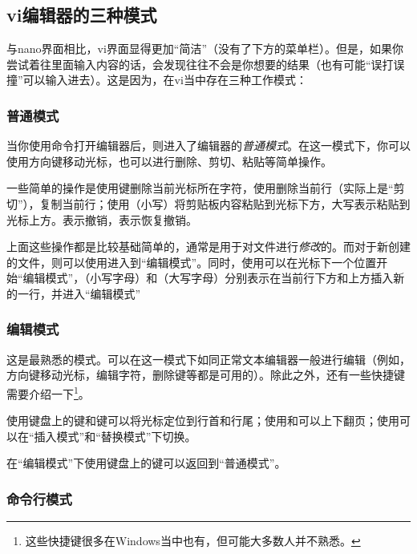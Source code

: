 \subsection{vi编辑器的三种模式}\label{subsec:使用vi,vim创建文件-vi编辑器的三种模式}

与nano界面相比，vi界面显得更加“简洁”（没有了下方的菜单栏）。但是，如果你尝试着往里面输入内容的话，会发现往往不会是你想要的结果（也有可能“误打误撞”可以输入进去）。这是因为，在vi当中存在三种工作模式：

\subsubsection{普通模式}

当你使用命令打开编辑器后，则进入了编辑器的\emph{普通模式}。在这一模式下，你可以使用方向键移动光标，也可以进行删除、剪切、粘贴等简单操作。

一些简单的操作是使用键删除当前光标所在字符，使用删除当前行（实际上是“剪切”），复制当前行；使用（小写）将剪贴板内容粘贴到光标下方，大写表示粘贴到光标上方。表示撤销，表示恢复撤销。

上面这些操作都是比较基础简单的，通常是用于对文件进行\emph{修改}的。而对于新创建的文件，则可以使用进入到“编辑模式”。同时，使用可以在光标下一个位置开始“编辑模式”，（小写字母）和（大写字母）分别表示在当前行下方和上方插入新的一行，并进入“编辑模式”

\subsubsection{编辑模式}

这是最熟悉的模式。可以在这一模式下如同正常文本编辑器一般进行编辑（例如，方向键移动光标，编辑字符，删除键等都是可用的）。除此之外，还有一些快捷键需要介绍一下\footnote{这些快捷键很多在Windows当中也有，但可能大多数人并不熟悉。}。

使用键盘上的键和键可以将光标定位到行首和行尾；使用和可以上下翻页；使用可以在“插入模式”和“替换模式”下切换。

在“编辑模式”下使用键盘上的键可以返回到“普通模式”。

\subsubsection{命令行模式}

